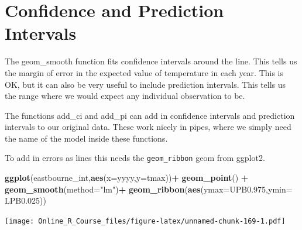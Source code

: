 \documentclass[]{book}
\newenvironment{Shaded}{\begin{snugshade}}{\end{snugshade}}
\newcommand{\DataTypeTok}[1]{\textcolor[rgb]{0.13,0.29,0.53}{#1}}
\newcommand{\DecValTok}[1]{\textcolor[rgb]{0.00,0.00,0.81}{#1}}
\newcommand{\FloatTok}[1]{\textcolor[rgb]{0.00,0.00,0.81}{#1}}
\newcommand{\KeywordTok}[1]{\textcolor[rgb]{0.13,0.29,0.53}{\textbf{#1}}}
\newcommand{\NormalTok}[1]{#1}
\newcommand{\OperatorTok}[1]{\textcolor[rgb]{0.81,0.36,0.00}{\textbf{#1}}}
\newcommand{\StringTok}[1]{\textcolor[rgb]{0.31,0.60,0.02}{#1}}
\begin{document}
\hypertarget{confidence-and-prediction-intervals}{%
\section{Confidence and Prediction Intervals}\label{confidence-and-prediction-intervals}}

The geom\_smooth function fits confidence intervals around the line. This tells us the margin of error in the expected value of temperature in each year.
This is OK, but it can also be very useful to include prediction intervals. This tells us the range where we would expect any individual observation to be.

The functions add\_ci and add\_pi can add in confidence intervals and prediction intervals to our original data. These work nicely in pipes, where we simply need the name of the model inside these functions.

\begin{Shaded}
\end{Shaded}

To add in errors as lines this needs the \texttt{geom\_ribbon} geom from ggplot2.

\begin{Shaded}
\begin{Highlighting}[]
\KeywordTok{ggplot}\NormalTok{(eastbourne_int,}\KeywordTok{aes}\NormalTok{(}\DataTypeTok{x=}\NormalTok{yyyy,}\DataTypeTok{y=}\NormalTok{tmax))}\OperatorTok{+}
\StringTok{ }\KeywordTok{geom_point}\NormalTok{() }\OperatorTok{+}
\StringTok{  }\KeywordTok{geom_smooth}\NormalTok{(}\DataTypeTok{method=}\StringTok{"lm"}\NormalTok{)}\OperatorTok{+}
\StringTok{   }\KeywordTok{geom_ribbon}\NormalTok{(}\KeywordTok{aes}\NormalTok{(}\DataTypeTok{ymax=}\NormalTok{UPB0}\FloatTok{.975}\NormalTok{,}\DataTypeTok{ymin=}\NormalTok{ LPB0}\FloatTok{.025}\NormalTok{)) }
\end{Highlighting}
\end{Shaded}

\texttt{[image: Online\_R\_Course\_files/figure-latex/unnamed-chunk-169-1.pdf]}
\end{document}
